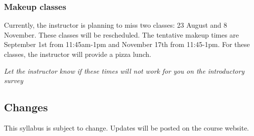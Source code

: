 \documentclass{article}
\begin{document}
\hypertarget{makeup_classes_29}{}\subsubsection*{{Makeup classes}}\label{makeup_classes_29}

Currently, the instructor is planning to miss two classes: 23 August and 8 November. These classes will be rescheduled. The tentative makeup times are September 1st from 11:45am-1pm and November 17th from 11:45-1pm. For these classes, the instructor will provide a pizza lunch.

\emph{Let the instructor know if these times will not work for you on the introductory survey}

\hypertarget{changes_30}{}\subsection*{{Changes}}\label{changes_30}

This syllabus is subject to change. Updates will be posted on the course website.
\end{document}
